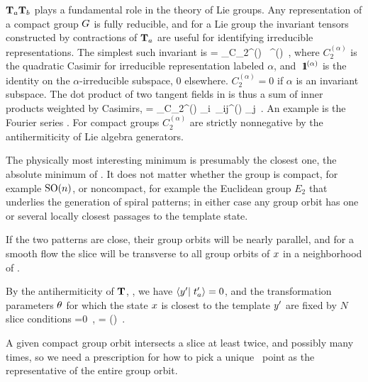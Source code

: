 \documentclass[%
 reprint,%
 amssymb, amsmath,%
 aip,cha,%
 graphicx
]{revtex4-1}
\begin{document}
$\mathbf{T}_a \mathbf{T}_b$ plays a fundamental role in the theory of Lie groups.
Any representation of a compact group $G$ is fully
reducible, and for a Lie group
the invariant tensors constructed by contractions
of $\mathbf{T}_a$ are useful for identifying irreducible
representations. The simplest such invariant is
\beq
\dual{\Lg} \cdot \Lg = \sum_\alpha C_2^{(\alpha)} \, \id^{(\alpha)}
\,,
where $C_2^{(\alpha)}$ is the quadratic Casimir for
irreducible representation labeled $\alpha$, and
${\ \hbox{{\rm 1}\kern-.6em\hbox{\rm 1}}}^{(\alpha)}$ is the identity on the $\alpha$-irreducible
subspace, 0 elsewhere. $ C_2^{(\alpha)} =0$ if $\alpha$
is an invariant subspace.
The dot product of two tangent fields in
 is thus a sum of inner products
weighted by Casimirs,
\beq
\braket{\groupTan(\sspRed)}{\groupTan(\slicep)}
   = \sum_\alpha C_2^{(\alpha)} \dual{\sspRed}_i\, \delta_{ij}^{(\alpha)} \slicep_j
\,.
An example is the Fourier series .
For compact groups $C_2^{(\alpha)}$ are strictly nonnegative by
the antihermiticity  of Lie algebra generators.


The physically most interesting minimum is
presumably the closest one, the absolute minimum of .
It does not matter whether the group is compact, for example $\textrm{SO}(n)$, or
noncompact, for example the Euclidean group $E_2$ that underlies the generation
of spiral patterns; in either case any group orbit has
one or several locally closest passages to the template state.







If the two patterns are
close, their group orbits will be nearly parallel, and for a smooth flow
the slice will be transverse to all group orbits of $x$ in a
neighborhood of \slicep.



By the antihermiticity of $\mathbf{T}$, ,  we have
$\braket{\slicep}{\sliceTan{a}}=0$, and the transformation parameters
${\bf \theta}$ for which the state $x$ is closest to the template
${y'}$ are fixed by $N$ slice conditions
\beq
{} =0
    \,,\qquad
\sspRed = \LieEl(\gSpace) \ssp
\,.

A given compact group orbit intersects a slice at least twice, and
possibly many times, so we need a prescription for how to
pick a unique \reducedsp\ point as the representative of the entire group
orbit.
\end{document}
